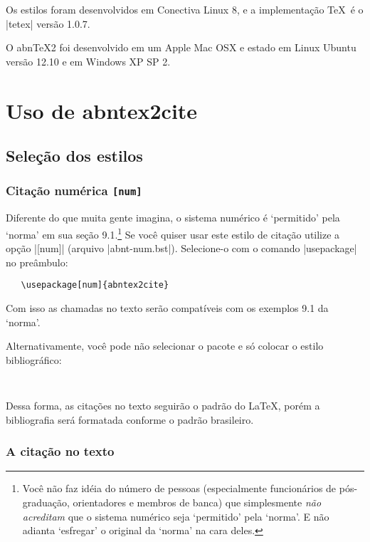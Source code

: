 \documentclass[a4paper]{ltxdoc}
\newcommand{\abnTeX}{abn\TeX}
\begin{document}
Os estilos foram desenvolvidos em Conectiva Linux 8, e a implementação \TeX\ é
o |tetex| versão 1.0.7.

O \abnTeX2 foi desenvolvido em um Apple Mac OSX e estado em Linux Ubuntu
versão 12.10 e em Windows XP SP 2.

\section{Uso de \textsf{abntex2cite}}

\subsection{Seleção dos estilos}

\subsubsection{Citação numérica \tt{[num]}}

\DescribeMacro{\usepackage[num]{abntex2cite}}
Diferente do que muita gente imagina, o sistema numérico é `permitido'  pela
`norma'\cite{NBR6023:2000} em sua seção 9.1.\footnote{Você não faz idéia do
número de pessoas (especialmente funcionários de pós-graduação, orientadores e
membros de banca) que simplesmente \emph{não acreditam} que o sistema numérico
seja `permitido' pela `norma'. E não adianta `esfregar' o original da `norma' na
cara deles.} Se você quiser usar este estilo de citação utilize a opção |[num]|
(arquivo |abnt-num.bst|). Selecione-o com o comando |usepackage| no preâmbulo:

\begin{verbatim}
   \usepackage[num]{abntex2cite}
\end{verbatim}

Com isso as chamadas no texto serão compatíveis com os exemplos 9.1 da
`norma'\cite{NBR6023:2000}.

\DescribeMacro{}
Alternativamente, você pode não selecionar o pacote e só colocar o estilo
bibliográfico:

\begin{verbatim}
    
\end{verbatim}

Dessa forma, as citações no texto seguirão o padrão do \LaTeX, porém a
bibliografia será formatada conforme o padrão brasileiro.

\subsubsection{A citação no texto}
\end{document}
